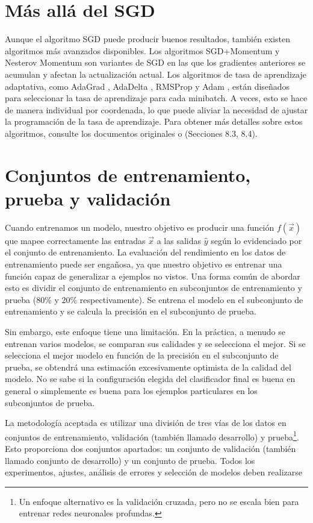 \section{Más allá del SGD}
Aunque el algoritmo SGD puede producir buenos resultados, también existen algoritmos más avanzados disponibles. Los algoritmos SGD+Momentum \cite{polyak1964some} y Nesterov Momentum \cite{nesterov2018lectures,sutskever2013importance} son variantes de SGD en las que los gradientes anteriores se acumulan y afectan la actualización actual. Los algoritmos de tasa de aprendizaje adaptativa, como AdaGrad \cite{duchi2011adaptive}, AdaDelta \cite{zeiler2012adadelta}, RMSProp \cite{tieleman2012lecture} y Adam \cite{kingma2014adam}, están diseñados para seleccionar la tasa de aprendizaje para cada minibatch. A veces, esto se hace de manera individual por coordenada, lo que puede aliviar la necesidad de ajustar la programación de la tasa de aprendizaje. Para obtener más detalles sobre estos algoritmos, consulte los documentos originales o \cite{goodfellow2016deep} (Secciones 8.3, 8.4).


\section{Conjuntos de entrenamiento, prueba y validación}
Cuando entrenamos un modelo, nuestro objetivo es producir una función $f(\vec{x})$ que mapee correctamente las entradas $\vec{x}$ a las salidas $\hat{y}$ según lo evidenciado por el conjunto de entrenamiento. La evaluación del rendimiento en los datos de entrenamiento puede ser engañosa, ya que nuestro objetivo es entrenar una función capaz de generalizar a ejemplos no vistos. Una forma común de abordar esto es dividir el conjunto de entrenamiento en subconjuntos de entrenamiento y prueba (80\% y 20\% respectivamente). Se entrena el modelo en el subconjunto de entrenamiento y se calcula la precisión en el subconjunto de prueba.

Sin embargo, este enfoque tiene una limitación. En la práctica, a menudo se entrenan varios modelos, se comparan sus calidades y se selecciona el mejor. Si se selecciona el mejor modelo en función de la precisión en el subconjunto de prueba, se obtendrá una estimación excesivamente optimista de la calidad del modelo. No se sabe si la configuración elegida del clasificador final es buena en general o simplemente es buena para los ejemplos particulares en los subconjuntos de prueba.

La metodología aceptada es utilizar una división de tres vías de los datos en conjuntos de entrenamiento, validación (también llamado desarrollo) y prueba\footnote{Un enfoque alternativo es la validación cruzada, pero no se escala bien para entrenar redes neuronales profundas.}. Esto proporciona dos conjuntos apartados: un conjunto de validación (también llamado conjunto de desarrollo) y un conjunto de prueba. Todos los experimentos, ajustes, análisis de errores y selección de modelos deben realizarse

